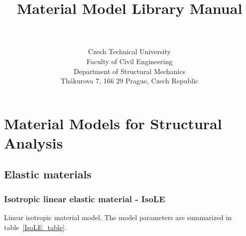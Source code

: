 \documentclass[a4paper]{article}
\begin{document}
\title{
Material Model Library Manual}
\author{\bp \\ \\
Czech Technical University\\
Faculty of Civil Engineering\\
Department of Structural Mechanics\\
Th\'akurova 7, 166 29 Prague, Czech Republic
}
\maketitle

\newpage
\tableofcontents
\listoftables
\newpage
\section{Material Models for Structural Analysis}
\subsection{Elastic materials}
\subsubsection{Isotropic linear elastic material - IsoLE}
\label{IsoLE}
Linear isotropic material model. The model parameters are summarized
in table~\ref{IsoLE_table}.
\end{document}

